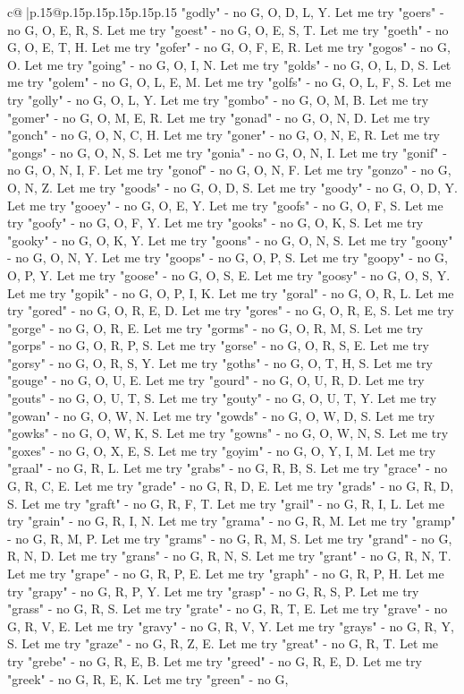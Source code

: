 \documentclass{article}
\begin{document}
{\begin{supertabular}{c@{$\;$}|p{.15\linewidth}@{}p{.15\linewidth}p{.15\linewidth}p{.15\linewidth}p{.15\linewidth}p{.15\linewidth}}
{{{"godly" {-} no G, O, D, L, Y. Let me try "goers" {-} no G, O, E, R, S. Let me try "goest" {-} no G, O, E, S, T. Let me try "goeth" {-} no G, O, E, T, H. Let me try "gofer" {-} no G, O, F, E, R. Let me try "gogos" {-} no G, O. Let me try "going" {-} no G, O, I, N. Let me try "golds" {-} no G, O, L, D, S. Let me try "golem" {-} no G, O, L, E, M. Let me try "golfs" {-} no G, O, L, F, S. Let me try "golly" {-} no G, O, L, Y. Let me try "gombo" {-} no G, O, M, B. Let me try "gomer" {-} no G, O, M, E, R. Let me try "gonad" {-} no G, O, N, D. Let me try "gonch" {-} no G, O, N, C, H. Let me try "goner" {-} no G, O, N, E, R. Let me try "gongs" {-} no G, O, N, S. Let me try "gonia" {-} no G, O, N, I. Let me try "gonif" {-} no G, O, N, I, F. Let me try "gonof" {-} no G, O, N, F. Let me try "gonzo" {-} no G, O, N, Z. Let me try "goods" {-} no G, O, D, S. Let me try "goody" {-} no G, O, D, Y. Let me try "gooey" {-} no G, O, E, Y. Let me try "goofs" {-} no G, O, F, S. Let me try "goofy" {-} no G, O, F, Y. Let me try "gooks" {-} no G, O, K, S. Let me try "gooky" {-} no G, O, K, Y. Let me try "goons" {-} no G, O, N, S. Let me try "goony" {-} no G, O, N, Y. Let me try "goops" {-} no G, O, P, S. Let me try "goopy" {-} no G, O, P, Y. Let me try "goose" {-} no G, O, S, E. Let me try "goosy" {-} no G, O, S, Y. Let me try "gopik" {-} no G, O, P, I, K. Let me try "goral" {-} no G, O, R, L. Let me try "gored" {-} no G, O, R, E, D. Let me try "gores" {-} no G, O, R, E, S. Let me try "gorge" {-} no G, O, R, E. Let me try "gorms" {-} no G, O, R, M, S. Let me try "gorps" {-} no G, O, R, P, S. Let me try "gorse" {-} no G, O, R, S, E. Let me try "gorsy" {-} no G, O, R, S, Y. Let me try "goths" {-} no G, O, T, H, S. Let me try "gouge" {-} no G, O, U, E. Let me try "gourd" {-} no G, O, U, R, D. Let me try "gouts" {-} no G, O, U, T, S. Let me try "gouty" {-} no G, O, U, T, Y. Let me try "gowan" {-} no G, O, W, N. Let me try "gowds" {-} no G, O, W, D, S. Let me try "gowks" {-} no G, O, W, K, S. Let me try "gowns" {-} no G, O, W, N, S. Let me try "goxes" {-} no G, O, X, E, S. Let me try "goyim" {-} no G, O, Y, I, M. Let me try "graal" {-} no G, R, L. Let me try "grabs" {-} no G, R, B, S. Let me try "grace" {-} no G, R, C, E. Let me try "grade" {-} no G, R, D, E. Let me try "grads" {-} no G, R, D, S. Let me try "graft" {-} no G, R, F, T. Let me try "grail" {-} no G, R, I, L. Let me try "grain" {-} no G, R, I, N. Let me try "grama" {-} no G, R, M. Let me try "gramp" {-} no G, R, M, P. Let me try "grams" {-} no G, R, M, S. Let me try "grand" {-} no G, R, N, D. Let me try "grans" {-} no G, R, N, S. Let me try "grant" {-} no G, R, N, T. Let me try "grape" {-} no G, R, P, E. Let me try "graph" {-} no G, R, P, H. Let me try "grapy" {-} no G, R, P, Y. Let me try "grasp" {-} no G, R, S, P. Let me try "grass" {-} no G, R, S. Let me try "grate" {-} no G, R, T, E. Let me try "grave" {-} no G, R, V, E. Let me try "gravy" {-} no G, R, V, Y. Let me try "grays" {-} no G, R, Y, S. Let me try "graze" {-} no G, R, Z, E. Let me try "great" {-} no G, R, T. Let me try "grebe" {-} no G, R, E, B. Let me try "greed" {-} no G, R, E, D. Let me try "greek" {-} no G, R, E, K. Let me try "green" {-} no G, }}}
\end{supertabular}}
\end{document}
